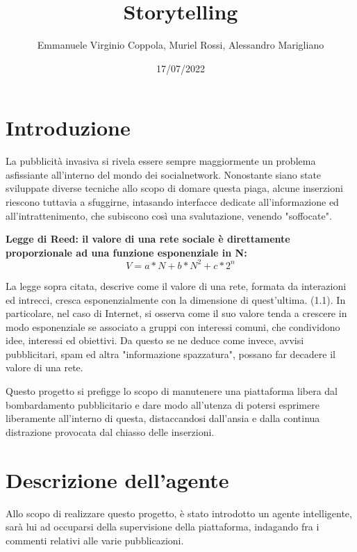 \documentclass{report}
\title{Storytelling} %
\author{Emmanuele Virginio Coppola, Muriel Rossi, Alessandro Marigliano} %
\date{17/07/2022}
\begin{document}
    \maketitle %

    \tableofcontents
    \chapter{Introduzione} %
    
    La pubblicità invasiva si rivela essere sempre maggiormente un problema asfissiante all'interno del mondo dei socialnetwork. Nonostante siano state sviluppate diverse tecniche
    allo scopo di domare questa piaga, alcune inserzioni riescono tuttavia a sfuggirne, intasando interfacce dedicate all'informazione ed 
    all'intrattenimento, che subiscono così una svalutazione, venendo "soffocate".
    \newline

    \textbf{Legge di Reed: il valore di una rete sociale è direttamente proporzionale ad una funzione esponenziale in N:}
    \begin{equation} %
        V=a*N+b*N^2 + c*2^n
    \end{equation}
    

    La legge sopra citata, descrive come il valore di una rete, formata da interazioni ed intrecci, cresca esponenzialmente con la dimensione di quest'ultima. (1.1).
    In particolare, nel caso di Internet, si osserva come il suo valore tenda a crescere in modo esponenziale se associato a gruppi con interessi
     comuni, che condividono idee, interessi ed obiettivi.
    Da questo se ne deduce come invece, avvisi pubblicitari, spam ed altra "informazione spazzatura", possano far decadere il valore di una rete.
    
    Questo progetto si prefigge lo scopo di manutenere una piattaforma libera dal bombardamento pubblicitario e dare modo all'utenza di potersi esprimere liberamente
    all'interno di questa, distaccandosi dall'ansia e dalla continua distrazione provocata dal chiasso delle inserzioni.
    \chapter{Descrizione dell'agente}
    Allo scopo di realizzare questo progetto, è stato introdotto un agente intelligente, sarà lui ad occuparsi della supervisione della piattaforma, indagando fra i 
    commenti relativi alle varie pubblicazioni.
\end{document}
